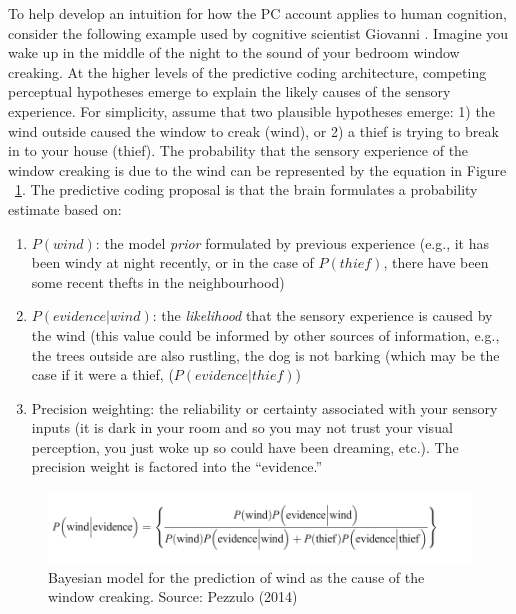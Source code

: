 \begin{CJK}{UTF8}{gbsn}
To help develop an intuition for how the PC account applies to human cognition, consider the following example used by cognitive scientist Giovanni \textcite{Pezzulo2013}.  Imagine you wake up in the middle of the night to the sound of your bedroom window creaking.  At the higher levels of the predictive coding architecture, competing perceptual hypotheses emerge to explain the likely causes of the sensory experience.  For simplicity, assume that two plausible hypotheses emerge: 1) the wind outside caused the window to creak (wind), or 2) a thief is trying to break in to your house (thief).  The probability that the sensory experience of the window creaking is due to the wind can be represented by the equation in Figure ~\ref{fig:windThief}.  The predictive coding proposal is that the brain formulates a probability estimate based on:

\begin{enumerate}
  \item $P(wind)$: the model \textit{prior} formulated by previous experience (e.g., it has been windy at night recently, or in the case of $P(thief)$, there have been some recent thefts in the neighbourhood)
  \item $P(evidence|wind)$: the \textit{likelihood} that the sensory experience is caused by the wind (this value could be informed by other sources of information, e.g., the trees outside are also rustling, the dog is not barking (which may be the case if it were a thief, ($P(evidence|thief)$)
  \item Precision weighting: the reliability or certainty associated with your sensory inputs (it is dark in your room and so you may not trust your visual perception, you just woke up so could have been dreaming, etc.).  The precision weight is factored into the ``evidence.''
\end{enumerate}


\begin{figure}[htbp]
  \begin{center}
    \includegraphics[scale=.5]{images/windThief.png}
      \caption{Bayesian model for the prediction of wind as the cause of the window creaking. Source: Pezzulo (2014)}
        \label{fig:windThief}
   \end{center}
\end{figure}


\end{CJK}
